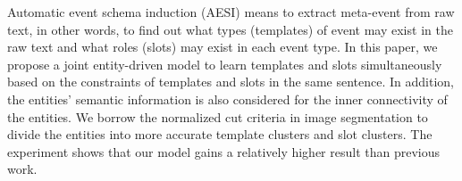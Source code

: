 Automatic event schema induction (AESI) means to extract meta-event from raw text, in other words, to find out what types (templates) of event may exist in the raw text and what roles (slots) may exist in each event type. In this paper, we propose a joint entity-driven model to learn templates and slots simultaneously based on the constraints of templates and slots in the same sentence. In addition, the entities' semantic information is also considered for the inner connectivity of the entities. We borrow the normalized cut criteria in image segmentation to divide the entities into more accurate template clusters and slot clusters.  The experiment shows that our model gains a relatively higher result than  previous work.
